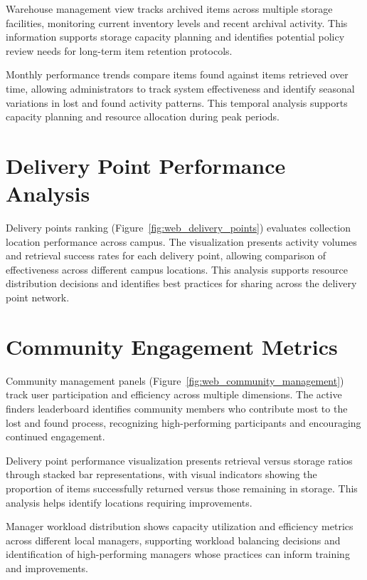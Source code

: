 Warehouse management view tracks archived items across multiple storage facilities, monitoring current inventory levels and recent archival activity. This information supports storage capacity planning and identifies potential policy review needs for long-term item retention protocols.

Monthly performance trends compare items found against items retrieved over time, allowing administrators to track system effectiveness and identify seasonal variations in lost and found activity patterns. This temporal analysis supports capacity planning and resource allocation during peak periods.

\section{Delivery Point Performance Analysis} \label{section:delivery_points}

Delivery points ranking (Figure~\ref{fig:web_delivery_points}) evaluates collection location performance across campus. The visualization presents activity volumes and retrieval success rates for each delivery point, allowing comparison of effectiveness across different campus locations. This analysis supports resource distribution decisions and identifies best practices for sharing across the delivery point network.

\section{Community Engagement Metrics} \label{section:community_engagement}

Community management panels (Figure~\ref{fig:web_community_management}) track user participation and efficiency across multiple dimensions. The active finders leaderboard identifies community members who contribute most to the lost and found process, recognizing high-performing participants and encouraging continued engagement.

Delivery point performance visualization presents retrieval versus storage ratios through stacked bar representations, with visual indicators showing the proportion of items successfully returned versus those remaining in storage. This analysis helps identify locations requiring improvements.

Manager workload distribution shows capacity utilization and efficiency metrics across different local managers, supporting workload balancing decisions and identification of high-performing managers whose practices can inform training and improvements.

